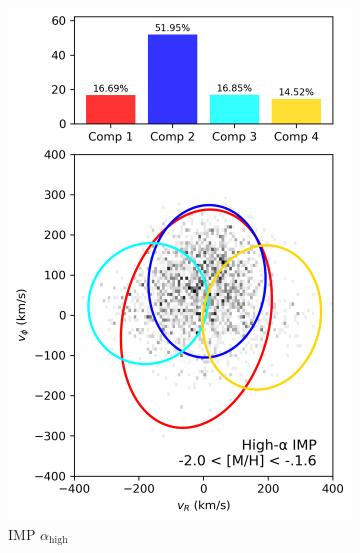 \documentclass[a4paper,10pt]{article}
\begin{document}
\begin{multicols}{2}
\begin{figure}[H]
  \hfill
  \begin{subfigure}[t]{0.24\linewidth}
    \includegraphics[width=\linewidth]{../figures/gmm_imp_high_alpha_k4.png}
    \caption{IMP $\alpha_{\mathrm{high}}$}
  \end{subfigure}
  \hfill
  \begin{subfigure}[t]{0.24\linewidth}

\end{subfigure}
\end{figure}
\end{multicols}
\end{document}
